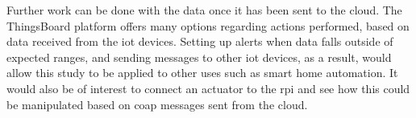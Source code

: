 Further work can be done with the data once it has been sent to the cloud.
The ThingsBoard platform offers many options regarding actions performed,
based on data received from the \gls{iot} devices. Setting up alerts when data
falls outside of expected ranges, and sending messages to other \gls{iot} 
devices, as a result, would allow this study to be applied to other uses such
as smart home automation. It would also be of interest to connect an 
actuator to the \gls{rpi} and see how this could be manipulated based on
\gls{coap} messages sent from the cloud. 